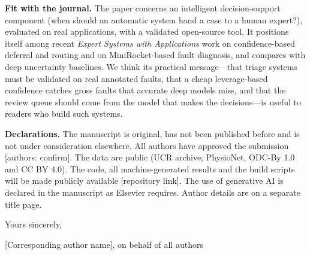 \documentclass[11pt]{article}
\begin{document}
\textbf{Fit with the journal.} The paper concerns an intelligent decision-support component (when should an automatic system hand a case to a human expert?), evaluated on real applications, with a validated open-source tool. It positions itself among recent \emph{Expert Systems with Applications} work on confidence-based deferral and routing and on MiniRocket-based fault diagnosis, and compares with deep uncertainty baselines. We think its practical message---that triage systems must be validated on real annotated faults, that a cheap leverage-based confidence catches gross faults that accurate deep models miss, and that the review queue should come from the model that makes the decisions---is useful to readers who build such systems.

\textbf{Declarations.} The manuscript is original, has not been published before and is not under consideration elsewhere. All authors have approved the submission [authors: confirm]. The data are public (UCR archive; PhysioNet, ODC-By 1.0 and CC BY 4.0). The code, all machine-generated results and the build scripts will be made publicly available [repository link]. The use of generative AI is declared in the manuscript as Elsevier requires. Author details are on a separate title page.

Yours sincerely,

[Corresponding author name], on behalf of all authors
\end{document}
